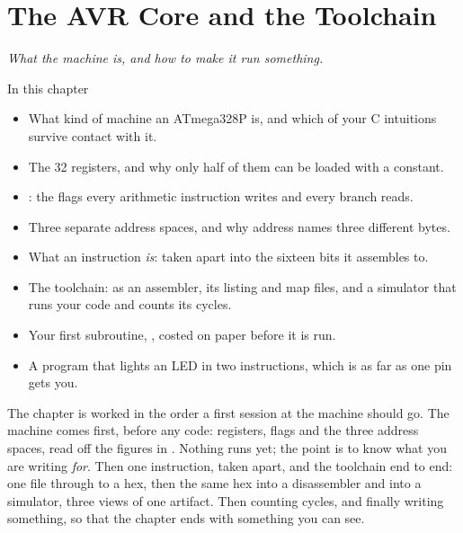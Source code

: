 
\chapter{The AVR Core and the Toolchain}
\label{c1:ch:core}

{\large\itshape What the machine is, and how to make it run something.\par}

\begin{chapterbox}{In this chapter}
\begin{itemize}
  \item What kind of machine an ATmega328P is, and which of your C intuitions survive contact
    with it.
  \item The 32 registers, and why only half of them can be loaded with a constant.
  \item {}: the flags every arithmetic instruction writes and every branch reads.
  \item Three separate address spaces, and why address  names three different bytes.
  \item What an instruction \emph{is}:  taken apart into the sixteen bits it
    assembles to.
  \item The toolchain:  as an assembler, its listing and map files, and a simulator
    that runs your code and counts its cycles.
  \item Your first subroutine, , costed on paper before it is run.
  \item A program that lights an LED in two instructions, which is as far as one pin gets you.
\end{itemize}
\end{chapterbox}

The chapter is worked in the order a first session at the machine should go. The machine comes
first, before any code: registers, flags and the three address spaces, read off the figures in
. Nothing runs yet; the point is to know what you are writing \emph{for}. Then
one instruction, taken apart, and the toolchain end to end: one  file through
 to a hex, then the same hex into a disassembler and into a simulator, three views of
one artifact. Then counting cycles, and finally writing something, so that the chapter ends with
something you can see.


